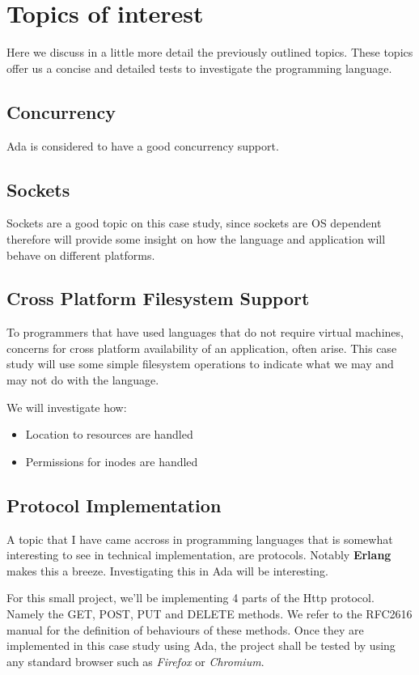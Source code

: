 \section{Topics of interest}
Here we discuss in a little more detail the previously outlined topics. These
topics offer us a concise and detailed tests to investigate the programming 
language.

\subsection{Concurrency}
Ada is considered to have a good concurrency support. 

\subsection{Sockets}
Sockets are a good topic on this case study, since sockets are OS dependent
therefore will provide some insight on how the language and application will
behave on different platforms. 

\subsection{Cross Platform Filesystem Support}
To programmers that have used languages that do not require virtual machines, 
concerns for cross platform availability of an application, often arise. This
case study will use some simple filesystem operations to indicate what we may
and may not do with the language.

We will investigate how:
\begin{itemize}
  \item Location to resources are handled
  \item Permissions for inodes are handled
\end{itemize}

\subsection{Protocol Implementation}
A topic that I have came accross in programming languages that is somewhat
interesting to see in technical implementation, are protocols. Notably 
\textbf{Erlang} makes this a breeze. Investigating this in Ada will be 
interesting. 

For this small project, we'll be implementing 4 parts of the Http protocol. 
Namely the GET, POST, PUT and DELETE methods. We refer to the RFC2616 manual 
for the definition of behaviours of these methods. Once they are implemented in
this case study using Ada, the project shall be tested by using any standard
browser such as \textit{Firefox} or \textit{Chromium}.

